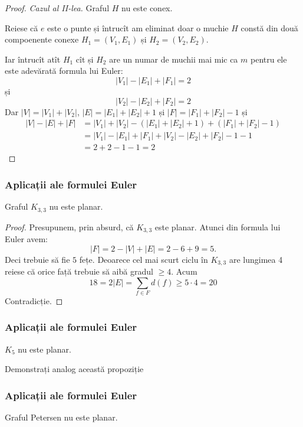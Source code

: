 \begin{frame}
\begin{proof}
{\em Cazul al II-lea.} Graful $H$ nu este conex. 

Reiese că $e$ este o punte și întrucît am eliminat doar o muchie $H$ constă din două compoenente conexe $H_1=(V_1,E_1)$ și 
$H_2=(V_2,E_2)$. 

Iar întrucît atît $H_1$ cît și $H_2$ are un numar de muchii mai mic ca $m$ pentru ele este adevărată formula lui Euler:
\[
 |V_1|-|E_1|+|F_1| = 2
\]
și
\[
 |V_2|-|E_2|+|F_2| = 2
\]
Dar $|V| = |V_1|+|V_2|$, $|E|=|E_1|+|E_2|+1$ și $|F| = |F_1|+|F_2|-1$ și 
\[
 \begin{array}{ll}
   |V|-|E|+|F| &= |V_1|+|V_2|-(|E_1|+|E_2|+1)+(|F_1|+|F_2|-1) \\
   & = |V_1|-|E_1|+|F_1| + |V_2|-|E_2|+|F_2| -1 -1\\
   &= 2 + 2 - 1 -1 =2
 \end{array} 
\]
\end{proof}

\end{frame}

\begin{frame}
  \frametitle{Aplicații ale formulei Euler}

Graful $K_{3,3}$ nu este planar.

\begin{proof}
Presupunem, prin absurd,  că $K_{3,3}$ este planar. Atunci din formula lui Euler 
avem:
\[
 |F| = 2 - |V| + |E| = 2-6+9 = 5.
\]
Deci trebuie să fie $5$ fețe. Deoarece cel mai scurt ciclu în $K_{3,3}$ are 
lungimea 4 reiese că orice față trebuie să aibă gradul $\geq 4$.
Acum
\[
 18 = 2|E| = \sum_{f\in F}d(f) \geq 5\cdot 4 = 20
\]
Contradicție.

\end{proof}
\end{frame}

\begin{frame}
  \frametitle{Aplicații ale formulei Euler}

 $K_5$ nu este planar.


Demonstrați analog această propoziție 
\end{frame}

\begin{frame}
  \frametitle{Aplicații ale formulei Euler}

 Graful Petersen nu este planar.
\end{frame}

